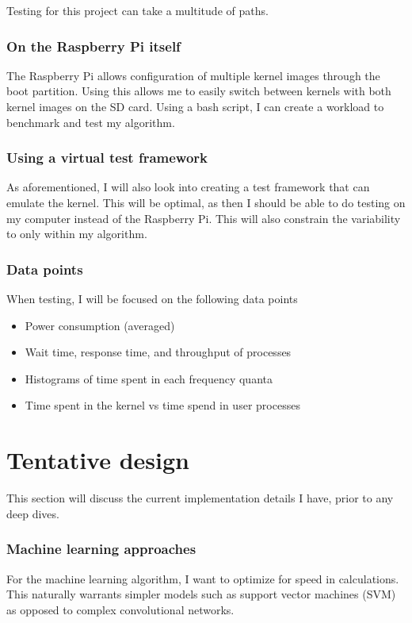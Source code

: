 \documentclass[12pt]{article}
\def\ind{\hspace*{0.3in}}
\begin{document}
\ind Testing for this project can take a multitude of paths. 

\subsubsection*{On the Raspberry Pi itself}

\ind The Raspberry Pi allows configuration of multiple kernel images through the boot partition. Using this allows me to easily switch between kernels with both kernel images on the SD card. Using a bash script, I can create a workload to benchmark and test my algorithm.

\subsubsection*{Using a virtual test framework}

\ind As aforementioned, I will also look into creating a test framework that can emulate the kernel. This will be optimal, as then I should be able to do testing on my computer instead of the Raspberry Pi. This will also constrain the variability to only within my algorithm.

\subsubsection*{Data points}

When testing, I will be focused on the following data points
\begin{itemize}
    \item Power consumption (averaged)
    \item Wait time, response time, and throughput of processes
    \item Histograms of time spent in each frequency quanta
    \item Time spent in the kernel vs time spend in user processes
\end{itemize}

\section*{Tentative design}

This section will discuss the current implementation details I have, prior to any deep dives.

\subsubsection*{Machine learning approaches}
\ind For the machine learning algorithm, I want to optimize for speed in calculations. This naturally warrants simpler models such as support vector machines (SVM) as opposed to complex convolutional networks. 
\end{document}
